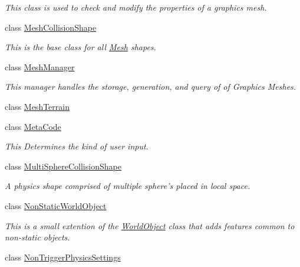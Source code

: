 \begin{DoxyCompactItemize}
\begin{DoxyCompactList}\small\item\em This class is used to check and modify the properties of a graphics mesh. \item\end{DoxyCompactList}\item 
class \hyperlink{classMezzanine_1_1MeshCollisionShape}{MeshCollisionShape}
\begin{DoxyCompactList}\small\item\em This is the base class for all \hyperlink{classMezzanine_1_1Mesh}{Mesh} shapes. \item\end{DoxyCompactList}\item 
class \hyperlink{classMezzanine_1_1MeshManager}{MeshManager}
\begin{DoxyCompactList}\small\item\em This manager handles the storage, generation, and query of of Graphics Meshes. \item\end{DoxyCompactList}\item 
class \hyperlink{classMezzanine_1_1MeshTerrain}{MeshTerrain}
\item 
class \hyperlink{classMezzanine_1_1MetaCode}{MetaCode}
\begin{DoxyCompactList}\small\item\em This Determines the kind of user input. \item\end{DoxyCompactList}\item 
class \hyperlink{classMezzanine_1_1MultiSphereCollisionShape}{MultiSphereCollisionShape}
\begin{DoxyCompactList}\small\item\em A physics shape comprised of multiple sphere's placed in local space. \item\end{DoxyCompactList}\item 
class \hyperlink{classMezzanine_1_1NonStaticWorldObject}{NonStaticWorldObject}
\begin{DoxyCompactList}\small\item\em This is a small extention of the \hyperlink{classMezzanine_1_1WorldObject}{WorldObject} class that adds features common to non-\/static objects. \item\end{DoxyCompactList}\item 
class \hyperlink{classMezzanine_1_1NonTriggerPhysicsSettings}{NonTriggerPhysicsSettings}

\end{DoxyCompactItemize}
